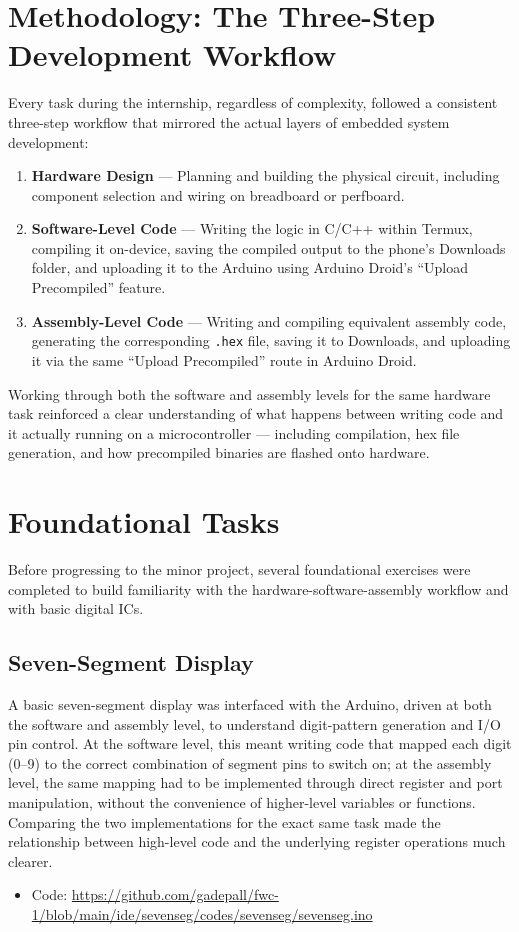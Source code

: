 \documentclass[12pt,a4paper]{report}
\begin{document}
\chapter{Methodology: The Three-Step Development Workflow}
\label{ch:methodology}
Every task during the internship, regardless of complexity, followed a consistent three-step workflow that mirrored the actual layers of embedded system development:
\begin{enumerate}
    \item \textbf{Hardware Design} --- Planning and building the physical circuit, including component selection and wiring on breadboard or perfboard.
    \item \textbf{Software-Level Code} --- Writing the logic in C/C++ within Termux, compiling it on-device, saving the compiled output to the phone's Downloads folder, and uploading it to the Arduino using Arduino Droid's ``Upload Precompiled'' feature.
    \item \textbf{Assembly-Level Code} --- Writing and compiling equivalent assembly code, generating the corresponding \texttt{.hex} file, saving it to Downloads, and uploading it via the same ``Upload Precompiled'' route in Arduino Droid.
\end{enumerate}
Working through both the software and assembly levels for the same hardware task reinforced a clear understanding of what happens between writing code and it actually running on a microcontroller --- including compilation, hex file generation, and how precompiled binaries are flashed onto hardware.
\chapter{Foundational Tasks}
\label{ch:foundational}
Before progressing to the minor project, several foundational exercises were completed to build familiarity with the hardware-software-assembly workflow and with basic digital ICs.
\section{Seven-Segment Display}
\label{sec:sevenseg}
A basic seven-segment display was interfaced with the Arduino, driven at both the software and assembly level, to understand digit-pattern generation and I/O pin control. At the software level, this meant writing code that mapped each digit (0--9) to the correct combination of segment pins to switch on; at the assembly level, the same mapping had to be implemented through direct register and port manipulation, without the convenience of higher-level variables or functions. Comparing the two implementations for the exact same task made the relationship between high-level code and the underlying register operations much clearer.
\begin{itemize}
    \item Code: \url{https://github.com/gadepall/fwc-1/blob/main/ide/sevenseg/codes/sevenseg/sevenseg.ino}
\end{itemize}
\end{document}
